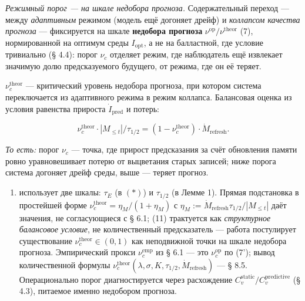 \documentclass[pdflatex,sn-mathphys-ay]{sn-jnl}
\providecommand{\tightlist}{\setlength{\itemsep}{0pt}\setlength{\parskip}{0pt}}
\begin{document}
\emph{Режимный порог --- на шкале недобора прогноза.} Содержательный переход --- между \emph{адаптивным} режимом (модель ещё догоняет дрейф) и \emph{коллапсом качества прогноза} --- фиксируется на шкале \textbf{недобора прогноза} \(\nu^{\text{op}}/\nu^{\text{theor}}\) (7), нормированной на оптимум среды \(I_{\text{opt}}\), а не на балластной, где условие тривиально (§ 4.4): порог \(\nu_c\) отделяет режим, где наблюдатель ещё извлекает значимую долю предсказуемого будущего, от режима, где он её теряет.



\(\nu_c^{\text{theor}}\) --- критический уровень недобора прогноза, при котором система переключается из адаптивного режима в режим коллапса. Балансовая оценка из условия равенства прироста \(\dot{I}_{\text{pred}}\) и потерь:



\begin{equation}\nu_c^{\text{theor}} \cdot |M_{\le t}| / \tau_{1/2} = (1 - \nu_c^{\text{theor}}) \cdot \dot{M}_{\text{refresh}}. \tag{11}\end{equation}



\emph{То есть:} порог \(\nu_c\) --- точка, где прирост предсказания за счёт обновления памяти ровно уравновешивает потерю от выцветания старых записей; ниже порога система догоняет дрейф среды, выше --- теряет прогноз.



\begin{enumerate}

\def\labelenumi{(\arabic{enumi})}

\setcounter{enumi}{10}

\tightlist

\item

  использует две шкалы: \(\tau_E\) (в \((*)\)) и \(\tau_{1/2}\) (в Лемме 1). Прямая подстановка в простейшей форме \(\nu_c^{\text{theor}} = \eta_M/(1+\eta_M)\) с \(\eta_M := \dot{M}_{\text{refresh}} \tau_{1/2} / |M_{\le t}|\) даёт значения, не согласующиеся с § 6.1; (11) трактуется как \emph{структурное балансовое условие}, не количественный предсказатель --- работа постулирует существование \(\nu_c^{\text{theor}} \in (0, 1)\) как неподвижной точки на шкале недобора прогноза. Эмпирический прокси \(\nu_c^{\text{emp}}\) из § 6.1 --- это \(\nu_c^{\text{op}}\) по (7'); вывод количественной формулы \(\nu_c^{\text{theor}}(\lambda, \sigma, K, \tau_{1/2}, \dot M_{\text{refresh}})\) --- § 8.5. Операционально порог диагностируется через расхождение \(C_v^{\text{static}}/C_v^{\text{predictive}}\) (§ 4.3), питаемое именно недобором прогноза.

\end{enumerate}
\end{document}
